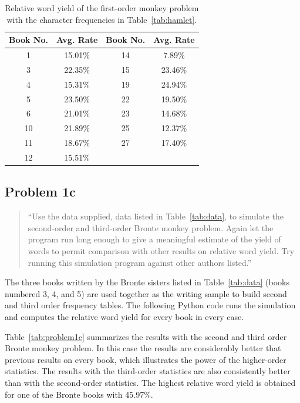 \documentclass[conference]{IEEEtran}
\newcommand{\codefile}[1]{
  \begin{framed}
  \fontsize{5.65}{6.78}\selectfont
  
  \end{framed}
}
\begin{document}
\begin{table}[htb]
\caption{Relative word yield of the first-order monkey problem \newline
with the character frequencies in Table~\ref{tab:hamlet}.\label{tab:problem1b}}
\vspace{-10pt}
\begin{center}
\begin{tabular}{cccc}
\hline
Book No. & Avg. Rate & Book No. & Avg. Rate \\
\hline
1  & 15.01\% & 14 & 7.89\% \\
3  & 22.35\% & 15 & 23.46\% \\
4  & 15.31\% & 19 & 24.94\% \\
5  & 23.50\% & 22 & 19.50\% \\
6  & 21.01\% & 23 & 14.68\% \\
10 & 21.89\% & 25 & 12.37\% \\
11 & 18.67\% & 27 & 17.40\% \\
12 & 15.51\% & & \\
\hline
\end{tabular}
\end{center}
\end{table}


\subsection{Problem 1c}

\begin{quote}
``Use the data supplied, data listed in Table~\ref{tab:data}, to simulate the second-order and third-order Bronte monkey problem. 
Again let the program run long enough to give a meaningful estimate of the yield of words to permit comparison with other results on relative word yield. 
Try running this simulation program against other authors listed.''
\end{quote}
\vspace{0.75em}

The three books written by the Bronte sisters listed in Table~\ref{tab:data} (books numbered 3, 4, and 5) are used together as the writing sample to build second and third order frequency tables.
The following Python code runs the simulation and computes the relative word yield for every book in every case.

\codefile{problem1c.py}

Table~\ref{tab:problem1c} summarizes the results with the second and third order Bronte monkey problem.
In this case the results are considerably better that previous results on every book, which illustrates the power of the higher-order statistics.
The results with the third-order statistics are also consistently better than with the second-order statistics.
The highest relative word yield is obtained for one of the Bronte books with 45.97\%.
\end{document}
